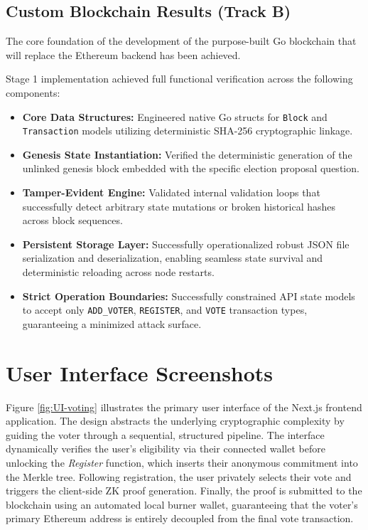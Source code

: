 \documentclass[12pt, a4paper]{report}
\begin{document}
\subsection{Custom Blockchain Results (Track B)}

The core foundation of the development of the purpose-built Go blockchain that will replace the Ethereum backend has been achieved.

Stage 1 implementation achieved full functional verification across the following components:
\begin{itemize}
    \item \textbf{Core Data Structures:} Engineered native Go structs for \texttt{Block} and \texttt{Transaction} models utilizing deterministic SHA-256 cryptographic linkage.
    \item \textbf{Genesis State Instantiation:} Verified the deterministic generation of the unlinked genesis block embedded with the specific election proposal question.
    \item \textbf{Tamper-Evident Engine:} Validated internal validation loops that successfully detect arbitrary state mutations or broken historical hashes across block sequences.
    \item \textbf{Persistent Storage Layer:} Successfully operationalized robust JSON file serialization and deserialization, enabling seamless state survival and deterministic reloading across node restarts.
    \item \textbf{Strict Operation Boundaries:} Successfully constrained API state models to accept only \texttt{ADD\_VOTER}, \texttt{REGISTER}, and \texttt{VOTE} transaction types, guaranteeing a minimized attack surface.
\end{itemize}


\newpage
\section{User Interface Screenshots}
Figure \ref{fig:UI-voting} illustrates the primary user interface of the Next.js frontend application. The design abstracts the underlying cryptographic complexity by guiding the voter through a sequential, structured pipeline. The interface dynamically verifies the user's eligibility via their connected wallet before unlocking the \textit{Register} function, which inserts their anonymous commitment into the Merkle tree. Following registration, the user privately selects their vote and triggers the client-side ZK proof generation. Finally, the proof is submitted to the blockchain using an automated local burner wallet, guaranteeing that the voter's primary Ethereum address is entirely decoupled from the final vote transaction.
\end{document}
